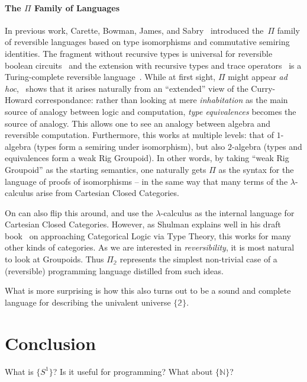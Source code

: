 \documentclass{entcs}
\newcommand{\bt}{\mathbb{2}}
\newcommand{\bracket}[1]{\ensuremath{\{#1\}}}
\newcommand{\PiTwo}{\ensuremath{\Pi_{\mathbb{2}}}}
\begin{document}
\paragraph*{The $\Pi$ Family of Languages}
\noindent In previous work, Carette, Bowman, James, and
Sabry~\cite{rc2011,James:2012:IE:2103656.2103667,Carette2016} introduced
the~$\Pi$ family of reversible languages based on type isomorphisms and
commutative semiring identities. The fragment without recursive types is
universal for reversible boolean circuits~\cite{James:2012:IE:2103656.2103667}
and the extension with recursive types and trace
operators~\cite{Hasegawa:1997:RCS:645893.671607} is a Turing-complete reversible
language~\cite{James:2012:IE:2103656.2103667,rc2011}. While at first sight,
$\Pi$ might appear \emph{ad hoc},~\cite{Carette2016} shows that it arises
naturally from an ``extended'' view of the Curry-Howard correspondance: rather
than looking at mere \emph{inhabitation} as the main source of analogy between
logic and computation, \emph{type equivalences} becomes the source of analogy.
This allows one to see an analogy between algebra and reversible computation.
Furthermore, this works at multiple levels: that of $1$-algebra (types form a
semiring under isomorphism), but also $2$-algebra (types and equivalences form a
weak Rig Groupoid).  In other words, by taking ``weak Rig Groupoid'' as the
starting semantics, one naturally gets $\Pi$ as the syntax for the language of
proofs of isomorphisms -- in the same way that many terms of the
$\lambda$-calculus arise from Cartesian Closed Categories.

On can also flip this around, and use the $\lambda$-calculus as the
internal language for Cartesian Closed Categories.  However, as Shulman
explains well in his draft book~\cite{Shullman} on approaching Categorical
Logic via Type Theory, this works for many other kinds of categories.  As
we are interested in \emph{reversibility}, it is most natural to look at
Groupoids.  Thus $\PiTwo$ represents the simplest non-trivial case of
a (reversible) programming language distilled from such ideas.

What is more surprising is how this also turns out to be a sound
and complete language for describing the univalent universe $\bracket{\bt}$.

\section{Conclusion}
\label{sec:conclusion}

What is $\bracket{S^1}$?  Is it useful for programming?  What about $\bracket{\mathbb{N}}$?
\end{document}
